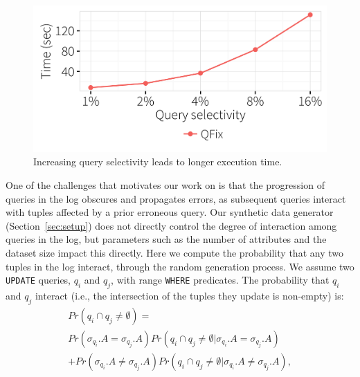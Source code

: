 \begin{figure}[t]
\centering
  \includegraphics[width =.75\columnwidth]{figures/rangevstime}
 \caption{ Increasing query selectivity leads to longer \sys execution time.}
  \label{f:selectivityvstime} 
\end{figure}

One of the challenges that motivates our work on \sys is that the progression
of queries in the log obscures and propagates errors, as subsequent queries
interact with tuples affected by a prior erroneous query. Our synthetic data
generator (Section~\ref{sec:setup}) does not directly control the degree of
interaction among queries in the log, but parameters such as the number of
attributes and the dataset size impact this directly. Here we compute the
probability that any two tuples in the log interact, through the random
generation process. We assume two \texttt{UPDATE} queries, $q_i$ and $q_j$,
with range \texttt{WHERE} predicates.  The probability that $q_i$ and $q_j$ interact (i.e., the intersection of the tuples they update is non-empty) is:
\begin{multline*}
Pr(q_i\cap q_j \neq \emptyset) =\\ 
Pr(\sigma_{q_i}.A= \sigma_{q_j}.A)Pr(q_i\cap q_j \neq \emptyset |\sigma_{q_i}.A= \sigma_{q_j}.A) \\
+ Pr(\sigma_{q_i}.A\neq \sigma_{q_j}.A)Pr(q_i\cap q_j \neq \emptyset |\sigma_{q_i}.A\neq \sigma_{q_j}.A), 
\end{multline*}



